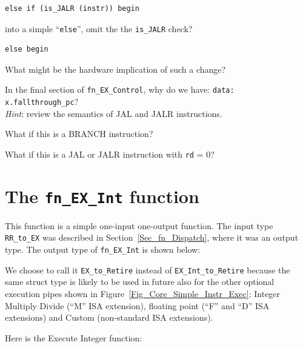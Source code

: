 {\small
\begin{Verbatim}[frame=single]
   else if (is_JALR (instr)) begin
\end{Verbatim}
}

into a simple ``\verb|else|'', {\ie} omit the the \verb|is_JALR|
check?

{\small
\begin{Verbatim}[frame=single]
   else begin
\end{Verbatim}
}

What might be the hardware implication of such a change?

\Exercise

In the final section of {\tt fn\_EX\_Control}, why do we have:
\verb|data: x.fallthrough_pc|? \\
\emph{Hint}: review the semantics of JAL and JALR instructions.

What if this is a BRANCH instruction?

What if this is a JAL or JALR instruction with \verb|rd| = 0?

\Endexercise


\section{The {\tt fn\_EX\_Int} function}

\label{Sec_fn_EX_Int}


This function is a simple one-input one-output function.  The input
type \verb|RR_to_EX| was described in Section~\ref{Sec_fn_Dispatch},
where it was an output type.  The output type of \verb|fn_EX_Int| is
shown below:



We choose to call it \verb|EX_to_Retire| instead of
\verb|EX_Int_to_Retire| because the same struct type is likely to be
used in future also for the other optional execution pipes shown in
Figure~\ref{Fig_Core_Simple_Instr_Exec}: Integer Multiply Divide
(``M'' ISA extension), floating point (``F'' and ``D'' ISA extensions)
and Custom (non-standard ISA extensions).

Here is the Execute Integer function:



